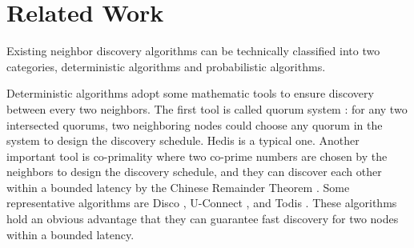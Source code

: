 \section{Related Work}
\label{RW}









Existing neighbor discovery algorithms can be technically classified into two categories, deterministic algorithms and probabilistic algorithms.

Deterministic algorithms adopt some mathematic tools to ensure discovery between every two neighbors. The first tool is called quorum system \cite{jiang2005quorum,luk1997two} : for any two intersected quorums, two neighboring nodes could choose any quorum in the system to design the discovery schedule. Hedis \cite{chen2015heterogeneous} is a typical one. Another important tool is co-primality where two co-prime numbers are chosen by the neighbors to design the discovery schedule, and they can discover each other within a bounded latency by the Chinese Remainder Theorem \cite{ding1996chinese}. Some representative algorithms are Disco \cite{dutta2008practical}, U-Connect \cite{kandhalu2010u}, and Todis \cite{chen2015heterogeneous}. These algorithms hold an obvious advantage that they can guarantee fast discovery for two nodes within a bounded latency. 

